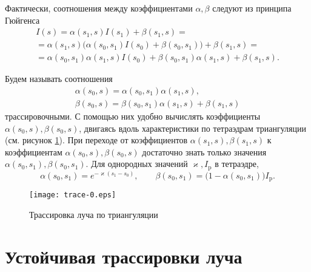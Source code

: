 Фактически, соотношения между коэффициентами $\alpha, \beta$ следуют из принципа Гюйгенса
\begin{multline*}
I(s) = \alpha(s_1, s) I(s_1) + \beta(s_1, s) = \\ =
\alpha(s_1, s) \Big(\alpha(s_0, s_1) I(s_0) + \beta(s_0, s_1)\Big) + \beta(s_1, s)
= \\ =
\alpha(s_0, s_1)\alpha(s_1, s) I(s_0) + \beta(s_0, s_1)\alpha(s_1, s) + \beta(s_1, s).
\end{multline*}

Будем называть соотношения
\begin{equation}
\begin{gathered}
\alpha(s_0, s) = \alpha(s_0, s_1)\alpha(s_1, s),\\
\beta(s_0, s) = \beta(s_0, s_1) \alpha(s_1, s) + \beta(s_1, s)
\end{gathered}
\end{equation}
трассировочными. С помощью них удобно вычислять коэффициенты $\alpha(s_0, s), \beta(s_0, s)$, двигаясь вдоль характеристики по тетраэдрам триангуляции (см. рисунок \ref{fig:trace}). При переходе от коэффициентов $\alpha(s_1, s), \beta(s_1, s)$ к коэффициентам $\alpha(s_0, s), \beta(s_0, s)$ достаточно знать только значения
$\alpha(s_0, s_1), \beta(s_0, s_1)$. Для однородных значений $\varkappa, I_\text{p}$ в тетраэдре,
\[
\alpha(s_0, s_1) = e^{-\varkappa (s_1 - s_0)},\qquad
\beta(s_0, s_1) = \big(1 - \alpha(s_0, s_1)\big) I_\text{p}.
\]
\begin{figure}[ht!]
\centering
\texttt{[image: trace-0.eps]}
\caption{Трассировка луча по триангуляции}
\label{fig:trace}
\end{figure}

\section{Устойчивая трассировки луча}

